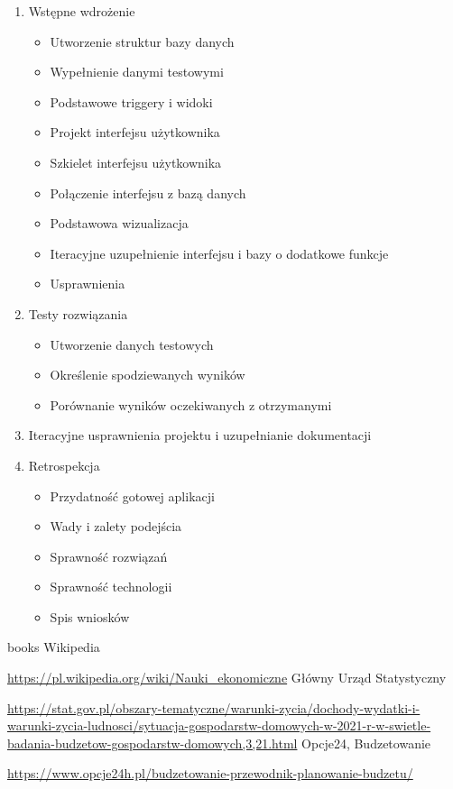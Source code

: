 \documentclass[a4paper,12pt]{report}
\begin{document}
\begin{enumerate}
\begin{itemize}
    \end{itemize}
    \item Wstępne wdrożenie
    \begin{itemize}
        \item Utworzenie struktur bazy danych
        \item Wypełnienie danymi testowymi
        \item Podstawowe triggery i widoki
        \item Projekt interfejsu użytkownika
        \item Szkielet interfejsu użytkownika
        \item Połączenie interfejsu z bazą danych
        \item Podstawowa wizualizacja
        \item Iteracyjne uzupełnienie interfejsu i bazy o dodatkowe funkcje
        \item Usprawnienia
    \end{itemize}
    \item Testy rozwiązania
    \begin{itemize}
        \item Utworzenie danych testowych
        \item Określenie spodziewanych wyników
        \item Porównanie wyników oczekiwanych z otrzymanymi 
    \end{itemize}
    \item Iteracyjne usprawnienia projektu i uzupełnianie dokumentacji
    \item Retrospekcja
    \begin{itemize}
        \item Przydatność gotowej aplikacji
        \item Wady i zalety podejścia
        \item Sprawność rozwiązań
        \item Sprawność technologii
        \item Spis wniosków
    \end{itemize}
\end{enumerate}
\begin{thebibliography} {books}
 Wikipedia \raggedright\url{https://pl.wikipedia.org/wiki/Nauki_ekonomiczne}
 Główny Urząd Statystyczny \raggedright\url{https://stat.gov.pl/obszary-tematyczne/warunki-zycia/dochody-wydatki-i-warunki-zycia-ludnosci/sytuacja-gospodarstw-domowych-w-2021-r-w-swietle-badania-budzetow-gospodarstw-domowych,3,21.html}
 Opcje24, Budzetowanie \raggedright\url{https://www.opcje24h.pl/budzetowanie-przewodnik-planowanie-budzetu/}
\end{thebibliography}
\end{document}
